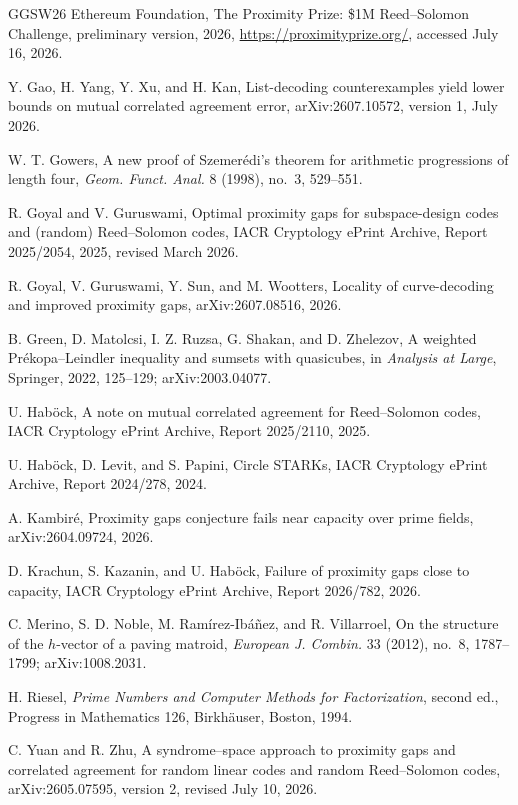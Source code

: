 \documentclass[11pt,a4paper]{amsart}
\numberwithin{equation}{section}
\theoremstyle{remark}
\begin{document}
\begin{thebibliography}{GGSW26}
{Ethereum Foundation},
\newblock The Proximity Prize: \$1M Reed--Solomon Challenge,
\newblock preliminary version, 2026,
\newblock \url{https://proximityprize.org/}, accessed July 16, 2026.

Y. Gao, H. Yang, Y. Xu, and H. Kan,
\newblock List-decoding counterexamples yield lower bounds on mutual
correlated agreement error,
\newblock arXiv:2607.10572, version 1, July 2026.

W. T. Gowers,
\newblock A new proof of Szemer\'edi's theorem for arithmetic progressions
of length four,
\newblock \emph{Geom. Funct. Anal.} 8 (1998), no.~3, 529--551.

R. Goyal and V. Guruswami,
\newblock Optimal proximity gaps for subspace-design codes and (random)
Reed--Solomon codes,
\newblock IACR Cryptology ePrint Archive, Report 2025/2054, 2025,
revised March 2026.

R. Goyal, V. Guruswami, Y. Sun, and M. Wootters,
\newblock Locality of curve-decoding and improved proximity gaps,
\newblock arXiv:2607.08516, 2026.

B. Green, D. Matolcsi, I. Z. Ruzsa, G. Shakan, and D. Zhelezov,
\newblock A weighted Pr\'ekopa--Leindler inequality and sumsets with
quasicubes,
\newblock in \emph{Analysis at Large}, Springer, 2022, 125--129;
\newblock arXiv:2003.04077.

U. Hab\"ock,
\newblock A note on mutual correlated agreement for Reed--Solomon codes,
\newblock IACR Cryptology ePrint Archive, Report 2025/2110, 2025.

U. Hab\"ock, D. Levit, and S. Papini,
\newblock Circle STARKs,
\newblock IACR Cryptology ePrint Archive, Report 2024/278, 2024.

A. Kambir\'e,
\newblock Proximity gaps conjecture fails near capacity over prime fields,
\newblock arXiv:2604.09724, 2026.

D. Krachun, S. Kazanin, and U. Hab\"ock,
\newblock Failure of proximity gaps close to capacity,
\newblock IACR Cryptology ePrint Archive, Report 2026/782, 2026.

C. Merino, S. D. Noble, M. Ram\'irez-Ib\'a\~nez, and R. Villarroel,
\newblock On the structure of the \(h\)-vector of a paving matroid,
\newblock \emph{European J. Combin.} 33 (2012), no.~8, 1787--1799;
\newblock arXiv:1008.2031.

H. Riesel,
\newblock \emph{Prime Numbers and Computer Methods for Factorization},
second ed., Progress in Mathematics 126, Birkh{\"a}user, Boston, 1994.

C. Yuan and R. Zhu,
\newblock A syndrome--space approach to proximity gaps and correlated
agreement for random linear codes and random Reed--Solomon codes,
\newblock arXiv:2605.07595, version 2, revised July 10, 2026.

\end{thebibliography}
\end{document}

